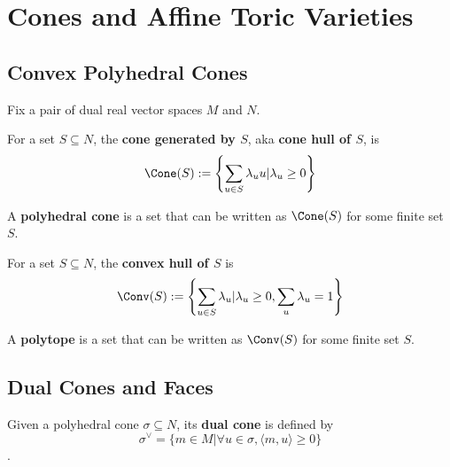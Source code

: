 \section{Cones and Affine Toric Varieties}

\subsection{Convex Polyhedral Cones}

Fix a pair of dual real vector spaces $M$ and $N$.


\begin{definition}
  \label{1-2-1-cone-hull}
  \uses{}
  \leanok

  For a set $S \subseteq N$, the {\bf cone generated by $S$}, aka {\bf cone hull of $S$}, is
  $$\Cone(S) := \left\{\sum_{u \in S} \lambda_u u | \lambda_u \ge 0\right\}$$
\end{definition}


\begin{definition}
  \label{1-2-1-polyhedral-cone}
  \leanok

  A {\bf polyhedral cone} is a set that can be written as $\Cone(S)$ for some finite set $S$.
\end{definition}


\begin{definition}
  \label{1-2-2-convex-hull}
  \uses{}
  \leanok

  For a set $S \subseteq N$, the {\bf convex hull of $S$} is
  $$\Conv(S) := \left\{\sum_{u \in S} \lambda_u | \lambda_u \ge 0, \sum_u \lambda_u = 1\right\}$$
\end{definition}


\begin{definition}[Polytope]
  \label{1-2-2-polytope}
  \leanok

  A {\bf polytope} is a set that can be written as $\Conv(S)$ for some finite set $S$.
\end{definition}


\subsection{Dual Cones and Faces}


\begin{definition}
  \label{1-2-3-dual-cone}
  \leanok

  Given a polyhedral cone $\sigma \subseteq N$, its {\bf dual cone} is defined by
  $$\sigma^\vee = \{m \in M | \forall u \in \sigma, \langle m, u\rangle \ge 0\}$$.
\end{definition}


